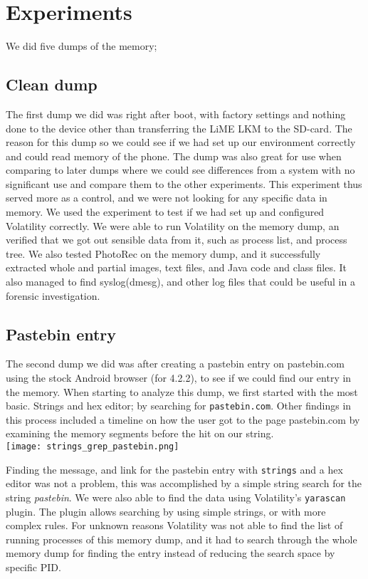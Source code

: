 \section{Experiments}
We did five dumps of the memory;
  \subsection{Clean dump}
The first dump we did was right after boot, with factory settings and nothing 
done to the device other than transferring the LiME LKM to the SD-card. The 
reason for this dump so we could see if we had set up our environment correctly 
and could read memory of the phone. The dump was also great for use when 
comparing to later dumps where we could see differences from a system with no 
significant use and compare them to the other experiments. This experiment
thus served more as a control, and we were not looking for any specific data in
memory. We used the experiment to test if we had set up and configured 
Volatility correctly. We were able to run Volatility on the memory dump, an 
verified that we got out sensible data from it, such as process list, and 
process tree. We also tested PhotoRec on the memory dump, and it successfully
extracted whole and partial images, text files, and Java code and class files.
It also managed to find syslog(dmesg), and other log files that could be useful
in a forensic investigation.
  
\subsection{Pastebin entry}
The second dump we did was after creating a pastebin entry on pastebin.com using
the stock Android browser (for 4.2.2), to see if we could find our entry in the 
memory. When starting to analyze this dump, we first started with the most basic.
Strings and hex editor; by searching for \texttt{pastebin.com}. Other findings in
this process included a timeline on how the user got to the page pastebin.com by 
examining the memory segments before the hit on our string.\\

\texttt{[image: strings\_grep\_pastebin.png]}


Finding the message, and link for the pastebin entry with \texttt{strings} and a
hex editor was not a problem, this was accomplished by a simple string search for
the string \textit{pastebin}. We were also able to find the data using Volatility's
\texttt{yarascan} plugin. The plugin allows searching by using simple strings,
or with more complex rules. For unknown reasons Volatility was not able to find
the list of running processes of this memory dump, and it had to search through 
the whole memory dump for finding the entry instead of reducing the search space 
by specific PID. 
  
